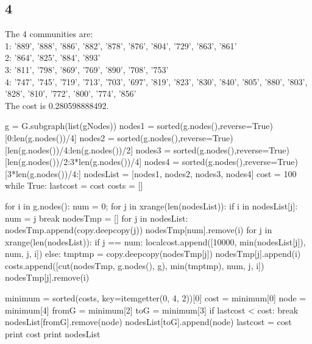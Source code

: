 \documentclass [11pt, a4paper, oneside] {article}
\begin{document}
\subsection *{4}
The 4 communities are:\\
1: '889', '888', '886', '882', '878', '876', '804', '729', '863', '861'\\
2: '864', '825', '884', '893'\\
3: '811', '798', '869', '769', '890', '708', '753'\\
4: '747',
  '745',
  '719',
  '713',
  '703',
  '697',
  '819',
  '823',
  '830',
  '840',
  '805',
  '880',
  '803',
  '828',
  '810',
  '772',
  '800',
  '774',
  '856'\\
 The cost is 0.280598888492.\\
 \begin{python}
 g = G.subgraph(list(gNodes))
nodes1 = sorted(g.nodes(),reverse=True)[0:len(g.nodes())/4]
nodes2 = sorted(g.nodes(),reverse=True)[len(g.nodes())/4:len(g.nodes())/2]
nodes3 = sorted(g.nodes(),reverse=True)[len(g.nodes())/2:3*len(g.nodes())/4]
nodes4 = sorted(g.nodes(),reverse=True)[3*len(g.nodes())/4:]
nodesList = [nodes1, nodes2, nodes3, nodes4]
cost = 100
while True:
    lastcost = cost
    costs = []
    
    for i in g.nodes():
        num = 0;
        for j in xrange(len(nodesList)):
            if i in nodesList[j]:
                num = j
                break
        nodesTmp = []
        for j in nodesList:
            nodesTmp.append(copy.deepcopy(j))
        nodesTmp[num].remove(i)
        for j in xrange(len(nodesList)):
            if j == num:
                localcost.append([10000, min(nodesList[j]), num, j, i])
            else:
                tmptmp = copy.deepcopy(nodesTmp[j])
                nodesTmp[j].append(i)
                costs.append([cut(nodesTmp, g.nodes(), g), min(tmptmp), num, j, i])
                nodesTmp[j].remove(i)
        
    minimum = sorted(costs, key=itemgetter(0, 4, 2))[0]
    cost = minimum[0]
    node = minimum[4]
    fromG = minimum[2]
    toG = minimum[3]
    if lastcost < cost:
        break
    nodesList[fromG].remove(node)
    nodesList[toG].append(node)
    lastcost = cost
    print cost
print nodesList
\end{python}
\end{document}

